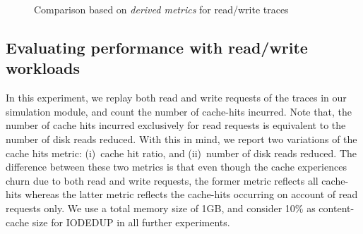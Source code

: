 	\vspace{-0.2in}
\begin{figure}[t]
	 \hfill
	\caption{Comparison based on \textit{derived metrics} for read/write traces}
	\label{fig:eval-read-write-perf-b}
\end{figure}


\subsection{Evaluating performance with read/write workloads}
In this experiment, we replay both read and write requests of the traces
in our simulation module, and count the number of cache-hits incurred.
Note that, the number of cache hits
incurred exclusively for read requests is equivalent to the number of
disk reads reduced.
With this in mind, we report two variations of the cache hits 
metric: (i)~cache hit ratio, and (ii)~number of disk reads reduced.
The difference between these two metrics is that even though the cache 
experiences churn due to both read and write requests, the former metric
reflects all cache-hits whereas the latter metric reflects the cache-hits
occurring on account of read requests only.
We use a total memory size of 1GB, and consider 10\%
as content-cache size for IODEDUP in all further experiments.


